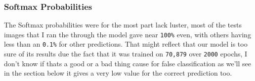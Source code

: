 \documentclass[11pt]{article}
\begin{document}
    \hypertarget{softmax-probabilities}{%
\subsubsection{Softmax Probabilities}\label{softmax-probabilities}}

The Softmax probabilities were for the most part lack luster, most of
the tests images that I ran the through the model gave near
\texttt{100\%} even, with others having less than an \texttt{0.1\%} for
other predictions. That might reflect that our model is too sure of its
results due the fact that it was trained on \texttt{70,879} over
\texttt{2000} epochs, I don't know if thats a good or a bad thing cause
for false classification as we'll see in the section below it gives a
very low value for the correct prediction too.
\end{document}
